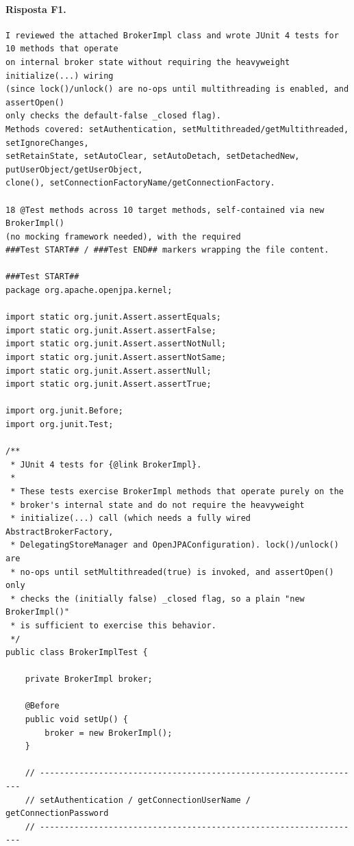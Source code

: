 \paragraph*{Risposta F1.}
\label{risposta:f1}
\begin{lstlisting}
I reviewed the attached BrokerImpl class and wrote JUnit 4 tests for 10 methods that operate
on internal broker state without requiring the heavyweight initialize(...) wiring
(since lock()/unlock() are no-ops until multithreading is enabled, and assertOpen()
only checks the default-false _closed flag).
Methods covered: setAuthentication, setMultithreaded/getMultithreaded, setIgnoreChanges,
setRetainState, setAutoClear, setAutoDetach, setDetachedNew, putUserObject/getUserObject,
clone(), setConnectionFactoryName/getConnectionFactory.

18 @Test methods across 10 target methods, self-contained via new BrokerImpl()
(no mocking framework needed), with the required
###Test START## / ###Test END## markers wrapping the file content.

###Test START##
package org.apache.openjpa.kernel;

import static org.junit.Assert.assertEquals;
import static org.junit.Assert.assertFalse;
import static org.junit.Assert.assertNotNull;
import static org.junit.Assert.assertNotSame;
import static org.junit.Assert.assertNull;
import static org.junit.Assert.assertTrue;

import org.junit.Before;
import org.junit.Test;

/**
 * JUnit 4 tests for {@link BrokerImpl}.
 *
 * These tests exercise BrokerImpl methods that operate purely on the
 * broker's internal state and do not require the heavyweight
 * initialize(...) call (which needs a fully wired AbstractBrokerFactory,
 * DelegatingStoreManager and OpenJPAConfiguration). lock()/unlock() are
 * no-ops until setMultithreaded(true) is invoked, and assertOpen() only
 * checks the (initially false) _closed flag, so a plain "new BrokerImpl()"
 * is sufficient to exercise this behavior.
 */
public class BrokerImplTest {

    private BrokerImpl broker;

    @Before
    public void setUp() {
        broker = new BrokerImpl();
    }

    // ------------------------------------------------------------------
    // setAuthentication / getConnectionUserName / getConnectionPassword
    // ------------------------------------------------------------------


\end{lstlisting}
